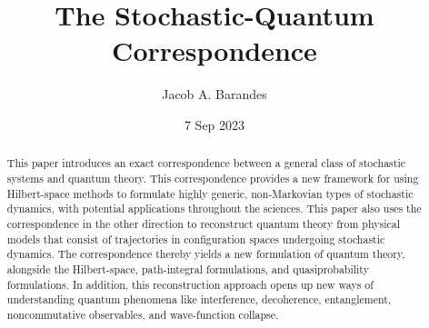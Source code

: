 \documentclass[12pt,english,prl,superscriptaddress,nobibnotes,nofootinbib]{revtex4-2}
\begin{document}
\title{The Stochastic-Quantum Correspondence}
\author{Jacob A. Barandes}

\date{7 Sep 2023 }
\begin{abstract}
This paper introduces an exact correspondence between a general class
of stochastic systems and quantum theory. This correspondence provides
a new framework for using Hilbert-space methods to formulate highly
generic, non-Markovian types of stochastic dynamics, with potential
applications throughout the sciences. This paper also uses the correspondence
in the other direction to reconstruct quantum theory from physical
models that consist of trajectories in configuration spaces undergoing
stochastic dynamics. The correspondence thereby yields a new formulation
of quantum theory, alongside the Hilbert-space, path-integral formulations,
and quasiprobability formulations. In addition, this reconstruction
approach opens up new ways of understanding quantum phenomena like
interference, decoherence, entanglement, noncommutative observables,
and wave-function collapse.
\end{abstract}
\maketitle
\end{document}
